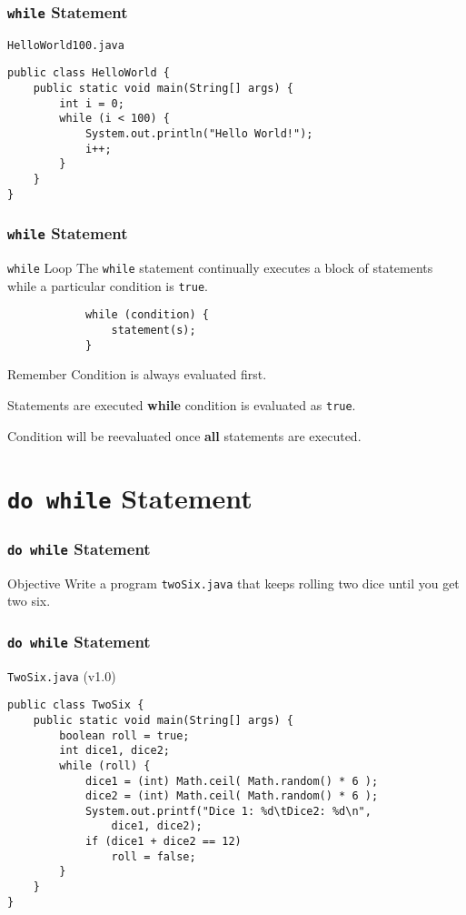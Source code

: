 \documentclass[10pt, compress]{beamer}
\begin{document}
\begin{frame}[fragile]
	\frametitle{\texttt{while} Statement}
	\begin{block}{\texttt{HelloWorld100.java}}
		\begin{verbatim}
public class HelloWorld {
	public static void main(String[] args) {
		int i = 0;
		while (i < 100) {
			System.out.println("Hello World!");
			i++;
		}
	}
}
		\end{verbatim}
	\end{block}
\end{frame}

\begin{frame}[fragile]
	\frametitle{\texttt{while} Statement}
	\begin{block}{\texttt{while} Loop}
		The \texttt{while} statement continually executes a block of statements while a particular condition is \texttt{true}.
		\begin{verbatim}
			while (condition) {
				statement(s);
			}
		\end{verbatim}
	\end{block}
	\begin{block}{Remember}
		Condition is always evaluated first.

		Statements are executed \textbf{while} condition is evaluated as \texttt{true}.

		Condition will be reevaluated once \textbf{all} statements are executed.
	\end{block}
\end{frame}

\section{\texttt{do while} Statement}

\begin{frame}[fragile]
	\frametitle{\texttt{do while} Statement}
	\begin{block}{Objective}
		Write a program \texttt{twoSix.java} that keeps rolling two dice until you get two six.
	\end{block}
\end{frame}

\begin{frame}[fragile]
	\frametitle{\texttt{do while} Statement}
	\begin{block}{\texttt{TwoSix.java} (v1.0)}
		\begin{verbatim}
public class TwoSix {
	public static void main(String[] args) {
		boolean roll = true;
		int dice1, dice2;
		while (roll) {
			dice1 = (int) Math.ceil( Math.random() * 6 );
			dice2 = (int) Math.ceil( Math.random() * 6 );
			System.out.printf("Dice 1: %d\tDice2: %d\n",
				dice1, dice2);
			if (dice1 + dice2 == 12)
				roll = false;
		}
	}
}
		\end{verbatim}
	\end{block}
\end{frame}
\end{document}
